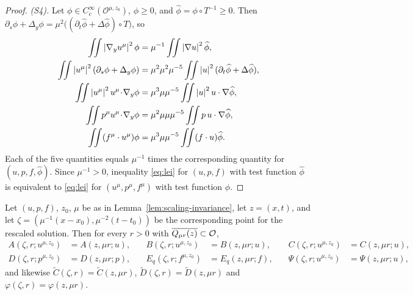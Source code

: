 \documentclass[11pt,reqno]{amsart}
\begin{document}
\begin{proof}
\emph{(S4).} Let $\phi\in C_{c}^{\infty}(\mathcal{O}^{\mu,z_{0}})$, $\phi\ge0$,
and $\widehat\phi=\phi\circ T^{-1}\ge0$. Then
$\partial_{s}\phi+\Delta_{y}\phi=\mu^{2}\bigl((\partial_{t}\widehat\phi+\Delta\widehat\phi)\circ T\bigr)$,
so
\[
\begin{aligned}
  \iint\left\lvert \nabla_{y}u^{\mu} \right\rvert^{2}\phi
    &=\mu^{-1}\iint\left\lvert \nabla u \right\rvert^{2}\widehat\phi,
  \\
  \iint\left\lvert u^{\mu} \right\rvert^{2}(\partial_{s}\phi+\Delta_{y}\phi)
    &=\mu^{2}\mu^{2}\mu^{-5}\iint\left\lvert u \right\rvert^{2}(\partial_{t}\widehat\phi+\Delta\widehat\phi),\\
  \iint\left\lvert u^{\mu} \right\rvert^{2}u^{\mu}\!\cdot\!\nabla_{y}\phi
    &=\mu^{3}\mu\mu^{-5}\iint\left\lvert u \right\rvert^{2}u\cdot\nabla\widehat\phi,
  \\
  \iint p^{\mu}u^{\mu}\!\cdot\!\nabla_{y}\phi
    &=\mu^{2}\mu\mu\mu^{-5}\iint p\,u\cdot\nabla\widehat\phi,\\
  \iint (f^{\mu}\cdot u^{\mu})\phi
    &=\mu^{3}\mu\mu^{-5}\iint(f\cdot u)\widehat\phi .
\end{aligned}
\]
Each of the five quantities equals $\mu^{-1}$ times the corresponding quantity
for $(u,p,f,\widehat\phi)$. Since $\mu^{-1}>0$, inequality \eqref{eq:lei} for
$(u,p,f)$ with test function $\widehat\phi$ is equivalent to \eqref{eq:lei} for
$(u^{\mu},p^{\mu},f^{\mu})$ with test function $\phi$.
\end{proof}

\begin{lemma}\label{lem:scaling-quantities}
Let $(u,p,f)$, $z_{0}$, $\mu$ be as in Lemma~\ref{lem:scaling-invariance}, let
$z=(x,t)$, and let $\zeta=(\mu^{-1}(x-x_{0}),\mu^{-2}(t-t_{0}))$ be the
corresponding point for the rescaled solution. Then for every $r>0$ with
$\overline{Q_{\mu r}(z)}\subset\mathcal{O}$,
\begin{equation}\label{eq:scaling-quantities}
\begin{aligned}
  A(\zeta,r;u^{\mu,z_{0}})&=A(z,\mu r;u),
  &\quad B(\zeta,r;u^{\mu,z_{0}})&=B(z,\mu r;u),
  &\quad C(\zeta,r;u^{\mu,z_{0}})&=C(z,\mu r;u),\\
  D(\zeta,r;p^{\mu,z_{0}})&=D(z,\mu r;p),
  &\quad E_{q}(\zeta,r;f^{\mu,z_{0}})&=E_{q}(z,\mu r;f),
  &\quad \Psi(\zeta,r;u^{\mu,z_{0}})&=\Psi(z,\mu r;u),
\end{aligned}
\end{equation}
and likewise $\widetilde C(\zeta,r)=\widetilde C(z,\mu r)$,
$\widetilde D(\zeta,r)=\widetilde D(z,\mu r)$ and
$\varphi(\zeta,r)=\varphi(z,\mu r)$.
\end{lemma}
\end{document}
